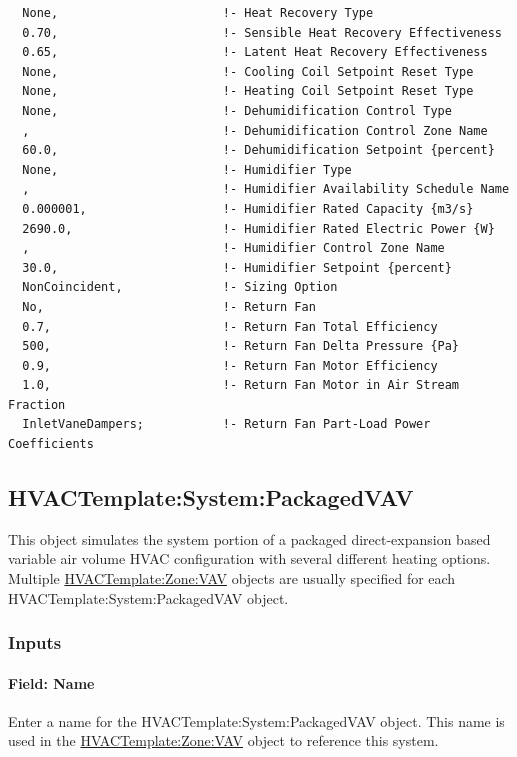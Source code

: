 \begin{lstlisting}
  None,                       !- Heat Recovery Type
  0.70,                       !- Sensible Heat Recovery Effectiveness
  0.65,                       !- Latent Heat Recovery Effectiveness
  None,                       !- Cooling Coil Setpoint Reset Type
  None,                       !- Heating Coil Setpoint Reset Type
  None,                       !- Dehumidification Control Type
  ,                           !- Dehumidification Control Zone Name
  60.0,                       !- Dehumidification Setpoint {percent}
  None,                       !- Humidifier Type
  ,                           !- Humidifier Availability Schedule Name
  0.000001,                   !- Humidifier Rated Capacity {m3/s}
  2690.0,                     !- Humidifier Rated Electric Power {W}
  ,                           !- Humidifier Control Zone Name
  30.0,                       !- Humidifier Setpoint {percent}
  NonCoincident,              !- Sizing Option
  No,                         !- Return Fan
  0.7,                        !- Return Fan Total Efficiency
  500,                        !- Return Fan Delta Pressure {Pa}
  0.9,                        !- Return Fan Motor Efficiency
  1.0,                        !- Return Fan Motor in Air Stream Fraction
  InletVaneDampers;           !- Return Fan Part-Load Power Coefficients
\end{lstlisting}

\subsection{HVACTemplate:System:PackagedVAV}\label{hvactemplatesystempackagedvav}

This object simulates the system portion of a packaged direct-expansion based variable air volume HVAC configuration with several different heating options. Multiple \hyperref[hvactemplatezonevav]{HVACTemplate:Zone:VAV} objects are usually specified for each HVACTemplate:System:PackagedVAV object.

\subsubsection{Inputs}\label{inputs-19-002}

\paragraph{Field: Name}\label{field-name-6-008}

Enter a name for the HVACTemplate:System:PackagedVAV object. This name is used in the \hyperref[hvactemplatezonevav]{HVACTemplate:Zone:VAV} object to reference this system.

